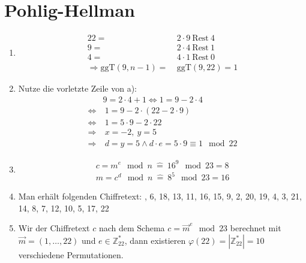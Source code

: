 \documentclass[DIN, pagenumber=false, fontsize=11pt, parskip=half]{scrartcl}
\newcommand{\Z}[0]{\mathbb{Z}}
\newcommand{\ggt}{\text{ggT}}
\newcommand{\rem}{\ \text{Rest} \ }
\newcommand{\congTo}[2]{\equiv #1\mod #2}
\begin{document}
    \section{Pohlig-Hellman}
    \begin{enumerate}[label=\alph*)]
        \item 
        \begin{align*}
            22 =& ~2 \cdot 9 \rem 4 \\
            9 =& ~2 \cdot 4 \rem 1 \\
            4 =& ~4 \cdot 1 \rem 0 \\
            \Rightarrow \ggt(9, n-1) =& ~\ggt(9, 22) = 1
        \end{align*}
        \item Nutze die vorletzte Zeile von a):
        \begin{align*}
            &9 = 2 \cdot 4 + 1 \Leftrightarrow 1 = 9 - 2 \cdot 4 \\
            \Leftrightarrow& ~1 = 9 - 2 \cdot (22 - 2 \cdot 9) \\
            \Leftrightarrow& ~1 = 5 \cdot 9 - 2 \cdot 22 \\
            \Rightarrow& ~x = -2, ~y = 5 \\
            \Rightarrow& ~d = y = 5 \wedge d \cdot e = 5 \cdot 9 \congTo{1}{22}
        \end{align*}
        \item 
        \begin{align*}
            c = m^e \mod n ~\hat{=}~ 16^9 \mod 23 = 8 \\
            m = c^d \mod n ~\hat{=}~ 8^5 \mod 23 = 16
        \end{align*}
        \item Man erhält folgenden Chiffretext: , 6, 18, 13, 11, 16, 15, 9, 2, 20, 19, 4, 3, 21, 14, 8, 7, 12, 10, 5, 17, 22
        \item Wir der Chiffretext $c$ nach dem Schema $c=\vec{m}^e \mod 23$ berechnet mit 
        $\vec{m} = (1, \dots, 22)$ und $e \in \Z_{22}^*$, dann existieren $\varphi(22) = |\Z_{22}^*| = 10$
        verschiedene Permutationen.
    \end{enumerate}
\end{document}
